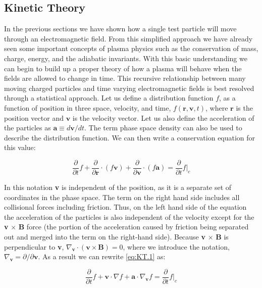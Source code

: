 \documentclass[utf8]{report}
\begin{document}
\subsection{Kinetic Theory} 

In the previous sections we have shown how a single test particle will move through an electromagnetic field. From this simplified approach we have already seen some important concepts of plasma physics such as the conservation of mass, charge, energy, and the adiabatic invariants. With this basic understanding we can begin to build up a proper theory of how a plasma will behave when the fields are allowed to change in time. This recursive relationship between many moving charged particles and time varying electromagnetic fields is best resolved through a statistical approach. Let us define a distribution function $f$, as a function of position in three space, velocity, and time, $f(\textbf{r}, \textbf{v}, t)$, where $\textbf{r}$ is the position vector and $\textbf{v}$ is the velocity vector. Let us also define the acceleration of the particles as $\textbf{a} \equiv d\textbf{v}/dt$. The term phase space density can also be used to describe the distribution function. We can then write a conservation equation for this value: 

\begin{equation}
    \frac{\partial}{\partial t} f + \frac{\partial}{\partial \textbf{r}} \cdot (f\textbf{v}) + \frac{\partial}{\partial \textbf{v}} \cdot (f\textbf{a}) = \frac{\partial}{\partial t} f\vert_{c}
    \label{eq:KT.1}
\end{equation}

In this notation \textbf{v} is independent of the position, as it is a separate set of coordinates in the phase space.  The term on the right hand side includes all collisional forces including friction. Thus, on the left hand side of the equation the acceleration of the particles is also independent of the velocity except for the \textbf{v} $\times$ \textbf{B} force (the portion of the acceleration caused by friction being separated out and merged into the term on the right-hand side). Because \textbf{v} $\times$ \textbf{B} is perpendicular to \textbf{v}, $\nabla_{\textbf{v}} \cdot (\textbf{v} \times \textbf{B}) =0$, where we introduce the notation, $\nabla_{\textbf{v}} = \partial / \partial \textbf{v}$. As a result we can rewrite \ref{eq:KT.1} as: 

\begin{equation}
    \frac{\partial}{\partial t} f + \textbf{v} \cdot \nabla f + \textbf{a} \cdot \nabla_{\textbf{v}} f = \frac{\partial}{\partial t} f|_{c}
    \label{eq:KT.2}
\end{equation}
\end{document}
